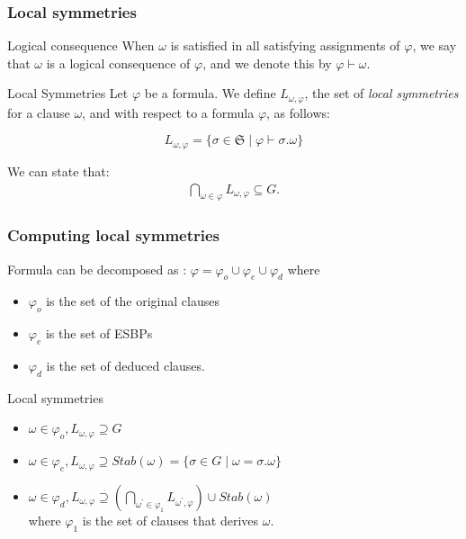 \documentclass{beamer}
\begin{document}
\begin{frame}[noframenumbering]
\frametitle{Local symmetries}
\newcommand{\symm}[0]{\ensuremath{\mathfrak{S}}}

\begin{block}{Logical consequence}
	When $\omega$ is satisfied in all satisfying assignments of $\varphi$, we say that $\omega$ is a
	logical consequence of $\varphi$, and we denote this by $\varphi \vdash \omega$.
\end{block}

\begin{block}{Local Symmetries}
	Let $\varphi$ be a formula. We define $L_{\omega,\varphi}$,
	the set of \textit{local symmetries} for a clause $\omega$, and with respect to
	a formula $\varphi$, as follows:

	$$L_{\omega,\varphi}=\{\sigma \in \symm \mid \varphi \vdash \sigma.\omega\}$$
\end{block}

 {
	\vfill
	We can state that:
	\begin{align*}
	\underset{\omega \in \varphi}{\bigcap}L_{\omega,\varphi} \subseteq G. %
	\end{align*}
}

\end{frame}
\begin{frame}[noframenumbering]
\frametitle{Computing local symmetries}

Formula can be decomposed as : $\varphi = \varphi_o \cup \varphi_e \cup \varphi_d$ where
\begin{itemize}
\item $\varphi_o$ is the set of the original clauses
\item $\varphi_e$ is the set of ESBPs
\item $\varphi_d$ is the set of deduced clauses.
\end{itemize}

\vfill

Local symmetries
\begin{itemize}
\item $\omega \in \varphi_o, L_{\omega,\varphi} \supseteq G $ %
\item $\omega \in \varphi_e, L_{\omega,\varphi} \supseteq Stab(\omega)=\{\sigma \in G \mid
\omega = \sigma.\omega\}$
\item $\omega \in \varphi_d, L_{\omega,\varphi} \supseteq (\underset{\omega^\prime \in
	\varphi_1}{\bigcap}L_{\omega^\prime,\varphi}) \cup Stab(\omega)$ \\  where $\varphi_1$ is the set of clauses that derives $\omega$.
\end{itemize}

\end{frame}
\end{document}
